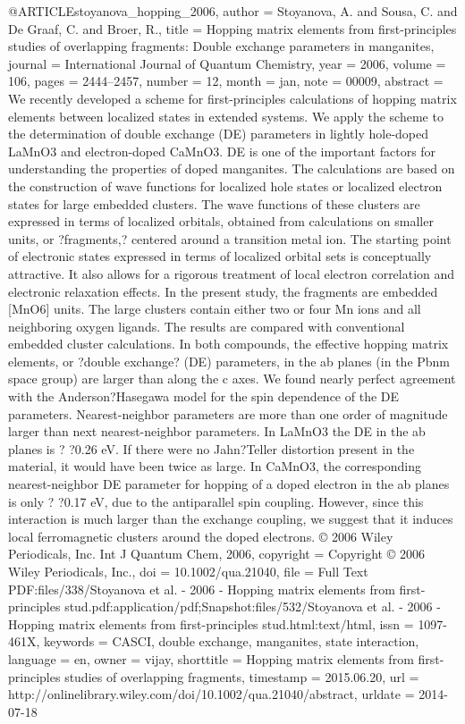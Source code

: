 @ARTICLE{stoyanova_hopping_2006,
  author = {Stoyanova, A. and Sousa, C. and De Graaf, C. and Broer, R.},
  title = {Hopping matrix elements from first-principles studies of overlapping
	fragments: {Double} exchange parameters in manganites},
  journal = {International Journal of Quantum Chemistry},
  year = {2006},
  volume = {106},
  pages = {2444--2457},
  number = {12},
  month = jan,
  note = {00009},
  abstract = {We recently developed a scheme for first-principles calculations of
	hopping matrix elements between localized states in extended systems.
	We apply the scheme to the determination of double exchange (DE)
	parameters in lightly hole-doped LaMnO3 and electron-doped CaMnO3.
	DE is one of the important factors for understanding the properties
	of doped manganites. The calculations are based on the construction
	of wave functions for localized hole states or localized electron
	states for large embedded clusters. The wave functions of these clusters
	are expressed in terms of localized orbitals, obtained from calculations
	on smaller units, or ?fragments,? centered around a transition metal
	ion. The starting point of electronic states expressed in terms of
	localized orbital sets is conceptually attractive. It also allows
	for a rigorous treatment of local electron correlation and electronic
	relaxation effects. In the present study, the fragments are embedded
	[MnO6] units. The large clusters contain either two or four Mn ions
	and all neighboring oxygen ligands. The results are compared with
	conventional embedded cluster calculations. In both compounds, the
	effective hopping matrix elements, or ?double exchange? (DE) parameters,
	in the ab planes (in the Pbnm space group) are larger than along
	the c axes. We found nearly perfect agreement with the Anderson?Hasegawa
	model for the spin dependence of the DE parameters. Nearest-neighbor
	parameters are more than one order of magnitude larger than next
	nearest-neighbor parameters. In LaMnO3 the DE in the ab planes is
	? ?0.26 eV. If there were no Jahn?Teller distortion present in the
	material, it would have been twice as large. In CaMnO3, the corresponding
	nearest-neighbor DE parameter for hopping of a doped electron in
	the ab planes is only ? ?0.17 eV, due to the antiparallel spin coupling.
	However, since this interaction is much larger than the exchange
	coupling, we suggest that it induces local ferromagnetic clusters
	around the doped electrons. © 2006 Wiley Periodicals, Inc. Int J
	Quantum Chem, 2006},
  copyright = {Copyright © 2006 Wiley Periodicals, Inc.},
  doi = {10.1002/qua.21040},
  file = {Full Text PDF:files/338/Stoyanova et al. - 2006 - Hopping matrix elements from first-principles stud.pdf:application/pdf;Snapshot:files/532/Stoyanova et al. - 2006 - Hopping matrix elements from first-principles stud.html:text/html},
  issn = {1097-461X},
  keywords = {CASCI, double exchange, manganites, state interaction},
  language = {en},
  owner = {vijay},
  shorttitle = {Hopping matrix elements from first-principles studies of overlapping
	fragments},
  timestamp = {2015.06.20},
  url = {http://onlinelibrary.wiley.com/doi/10.1002/qua.21040/abstract},
  urldate = {2014-07-18}
}

